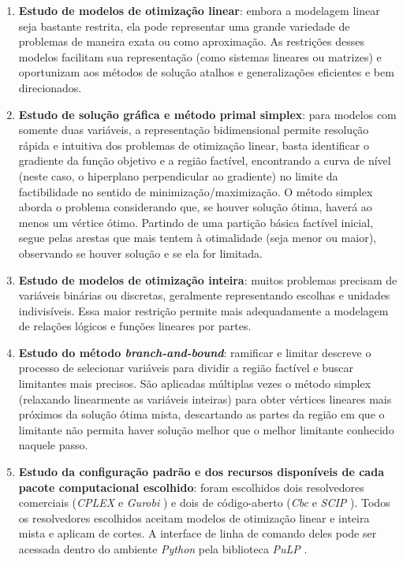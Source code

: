 \documentclass[]{article}
\newcommand{ \solver }[1]{\textit{#1}}
\newcommand{ \python }[1]{\textit{#1}}
\begin{document}
		\begin{enumerate}
			
			\item \textbf{Estudo de modelos de otimização linear}:
				embora a modelagem linear seja bastante restrita, ela pode representar uma grande variedade de problemas de maneira exata ou como aproximação. 
				As restrições desses modelos facilitam sua representação (como sistemas lineares ou matrizes) e oportunizam aos métodos de solução atalhos e generalizações eficientes e bem direcionados.
				
			\item \textbf{Estudo de solução gráfica e método primal simplex}:
				para modelos com somente duas variáveis, a representação bidimensional permite resolução rápida e intuitiva dos problemas de otimização linear, basta identificar o gradiente da função objetivo e a região factível, encontrando a curva de nível (neste caso, o hiperplano perpendicular ao gradiente) no limite da factibilidade no sentido de minimização/maximização. 
				O método simplex aborda o problema considerando que, se houver solução ótima, haverá ao menos um vértice ótimo. Partindo de uma partição básica factível inicial, segue pelas arestas que mais tentem à otimalidade (seja menor ou maior), observando se houver solução e se ela for limitada. 
				
			\item \textbf{Estudo de modelos de otimização inteira}:
				muitos problemas precisam de variáveis binárias ou discretas, geralmente representando escolhas e unidades indivisíveis. 
				Essa maior restrição permite mais adequadamente a modelagem de relações lógicos e funções lineares por partes. 
				
			\item \textbf{Estudo do método \textit{branch-and-bound}}:
				ramificar e limitar descreve o processo de selecionar variáveis para dividir a região factível e buscar limitantes mais precisos.
				São aplicadas múltiplas vezes o método simplex (relaxando linearmente as variáveis inteiras) para obter vértices lineares mais próximos da solução ótima mista, descartando as partes da região em que o limitante não permita haver solução melhor que o melhor limitante conhecido naquele passo.
				
			\item \textbf{Estudo da configuração padrão e dos recursos disponíveis de cada pacote computacional escolhido}: 
				foram escolhidos dois resolvedores comerciais (\solver{CPLEX} \cite{CPLEX} e \solver{Gurobi} \cite{Gurobi}) e dois de código-aberto (\solver{Cbc} \cite{Cbc} e \solver{SCIP} \cite{SCIP}).
				Todos os resolvedores escolhidos aceitam modelos de otimização linear e inteira mista e aplicam de cortes. 
				A interface de linha de comando deles pode ser acessada dentro do ambiente \python{Python} pela biblioteca \python{PuLP} \cite{PuLP}.
				

\end{enumerate}
\end{document}
